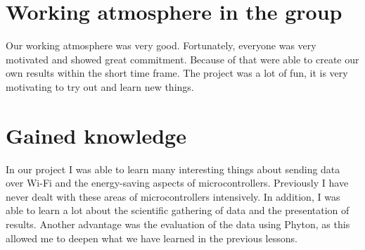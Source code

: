 \section*{Working atmosphere in the group}
Our working atmosphere was very good. Fortunately,
everyone was very motivated and showed great commitment.
Because of that were able to create our own results within the short time frame.
The project was a lot of fun, it is very motivating to try out and learn new things.
\section*{Gained knowledge}
In our project I was able to learn many interesting things about sending data over Wi-Fi
and the energy-saving aspects of microcontrollers.
Previously I have never dealt with these areas of microcontrollers intensively.
In addition, I was able to learn a lot about the scientific gathering
of data and the presentation of results.
Another advantage was the evaluation of the data using Phyton,
as this allowed me to deepen what we have learned in the previous lessons.
